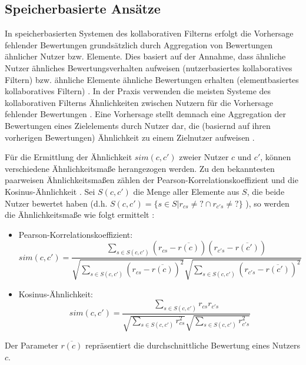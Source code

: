 \subsection{Speicherbasierte Ansätze}
In speicherbasierten Systemen des kollaborativen Filterns erfolgt die Vorhersage fehlender Bewertungen grundsätzlich durch Aggregation \cite[S.738]{adomavicius:inproceedings} von Bewertungen ähnlicher Nutzer bzw. Elemente.
Dies basiert auf der Annahme, dass ähnliche Nutzer ähnliches Bewertungsverhalten aufweisen (nutzerbasiertes kollaboratives Filtern) bzw. ähnliche Elemente ähnliche Bewertungen erhalten (elementbasiertes kollaboratives Filtern) \cite[S. 29]{recommenderSystems:2016}.
In der Praxis verwenden die meisten Systeme des kollaborativen Filterns Ähnlichkeiten zwischen Nutzern für die Vorhersage fehlender Bewertungen \cite[S. 427]{recommenderSystems:2016}.
Eine Vorhersage stellt demnach eine Aggregation der Bewertungen eines Zielelements durch Nutzer dar, die (basiernd auf ihren vorherigen Bewertungen) Ähnlichkeit zu einem Zielnutzer aufweisen \cite[S.738]{adomavicius:inproceedings}.

Für die Ermittlung der Ähnlichkeit $sim(c,c')$ zweier Nutzer $c$ und $c'$, können verschiedene Ähnlichkeitsmaße herangezogen werden.
Zu den bekanntesten paarweisen Ähnlichkeitsmaßen zählen der Pearson-Korrelationskoeffizient und die Kosinus-Ähnlichkeit \cite[S. 738]{adomavicius:inproceedings}\cite[S. 856]{adomavicius:4:inbook}.
Sei $S(c,c')$ die Menge aller Elemente aus $S$, die beide Nutzer bewertet haben (d.h. $S(c,c')=\{s \in S | r_{cs} \neq ? \cap r_{c's} \neq ?\}$ \cite[S. 738]{adomavicius:inproceedings}), so werden die Ähnlichkeitsmaße wie folgt ermittelt \cite[S. 856]{adomavicius:4:inbook}:
\begin{itemize}
    \item Pearson-Korrelationskoeffizient:
    \begin{equation}\label{eq13}
        sim(c,c') = \frac{\sum\limits_{s \in S(c,c')}(r_{cs}-\overline{r(c)})(r_{c's}-\overline{r(c')})}{\sqrt{\sum\limits_{s \in S(c,c')}(r_{cs}-\overline{r(c)})^{2}}\sqrt{\sum\limits_{s \in S(c,c')}(r_{c's}-\overline{r(c')})^{2}}}
    \end{equation}
    \item Kosinus-Ähnlichkeit:
    \begin{equation}\label{eq14}
        sim(c,c') = \frac{\sum\limits_{s \in S(c,c')}r_{cs}r_{c's}}{\sqrt{\sum\limits_{s \in S(c,c')}r_{cs}^{2}}\sqrt{\sum\limits_{s \in S(c,c')}r_{c's}^{2}}}
    \end{equation}
\end{itemize}
Der Parameter $\overline{r(c)}$ repräsentiert die durchschnittliche Bewertung eines Nutzers $c$.

